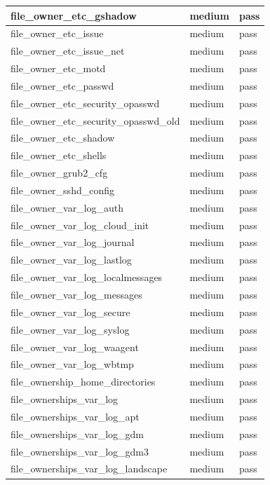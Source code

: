 \begin{longtable}{|p{10cm}|p{2cm}|p{2cm}|}
\hline
file\_owner\_etc\_gshadow & medium & pass \\
\hline
file\_owner\_etc\_issue & medium & pass \\
\hline
file\_owner\_etc\_issue\_net & medium & pass \\
\hline
file\_owner\_etc\_motd & medium & pass \\
\hline
file\_owner\_etc\_passwd & medium & pass \\
\hline
file\_owner\_etc\_security\_opasswd & medium & pass \\
\hline
file\_owner\_etc\_security\_opasswd\_old & medium & pass \\
\hline
file\_owner\_etc\_shadow & medium & pass \\
\hline
file\_owner\_etc\_shells & medium & pass \\
\hline
file\_owner\_grub2\_cfg & medium & pass \\
\hline
file\_owner\_sshd\_config & medium & pass \\
\hline
file\_owner\_var\_log\_auth & medium & pass \\
\hline
file\_owner\_var\_log\_cloud\_init & medium & pass \\
\hline
file\_owner\_var\_log\_journal & medium & pass \\
\hline
file\_owner\_var\_log\_lastlog & medium & pass \\
\hline
file\_owner\_var\_log\_localmessages & medium & pass \\
\hline
file\_owner\_var\_log\_messages & medium & pass \\
\hline
file\_owner\_var\_log\_secure & medium & pass \\
\hline
file\_owner\_var\_log\_syslog & medium & pass \\
\hline
file\_owner\_var\_log\_waagent & medium & pass \\
\hline
file\_owner\_var\_log\_wbtmp & medium & pass \\
\hline
file\_ownership\_home\_directories & medium & pass \\
\hline
file\_ownerships\_var\_log & medium & pass \\
\hline
file\_ownerships\_var\_log\_apt & medium & pass \\
\hline
file\_ownerships\_var\_log\_gdm & medium & pass \\
\hline
file\_ownerships\_var\_log\_gdm3 & medium & pass \\
\hline
file\_ownerships\_var\_log\_landscape & medium & pass \\
\hline

\end{longtable}
